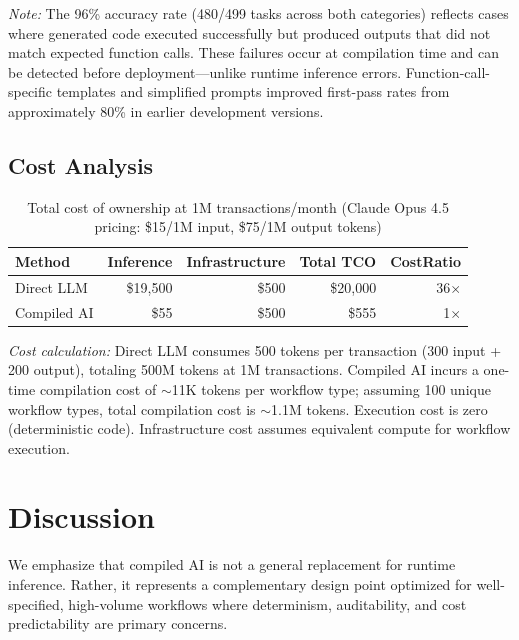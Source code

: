\documentclass[11pt]{article}
\begin{document}
\noindent\textit{Note:} The 96\% accuracy rate (480/499 tasks across both categories) reflects cases where generated code executed successfully but produced outputs that did not match expected function calls. These failures occur at compilation time and can be detected before deployment---unlike runtime inference errors. Function-call-specific templates and simplified prompts improved first-pass rates from approximately 80\% in earlier development versions.

\subsection{Cost Analysis}

\begin{table}[ht]
\centering
\caption{Total cost of ownership at 1M transactions/month (Claude Opus 4.5 pricing: \$15/1M input, \$75/1M output tokens)}
\label{tab:cost-results}
\begin{tabular}{lrrrr}
\toprule
Method & Inference & Infrastructure & Total TCO & CostRatio \\
\midrule
Direct LLM & \$19,500 & \$500 & \$20,000 & 36$\times$ \\
Compiled AI & \$55 & \$500 & \$555 & 1$\times$ \\
\bottomrule
\end{tabular}
\end{table}

\noindent\textit{Cost calculation:} Direct LLM consumes 500 tokens per transaction (300 input + 200 output), totaling 500M tokens at 1M transactions. Compiled AI incurs a one-time compilation cost of $\sim$11K tokens per workflow type; assuming 100 unique workflow types, total compilation cost is $\sim$1.1M tokens. Execution cost is zero (deterministic code). Infrastructure cost assumes equivalent compute for workflow execution.

\section{Discussion}
\label{sec:discussion}

We emphasize that compiled AI is not a general replacement for runtime inference. Rather, it represents a complementary design point optimized for well-specified, high-volume workflows where determinism, auditability, and cost predictability are primary concerns.
\end{document}
